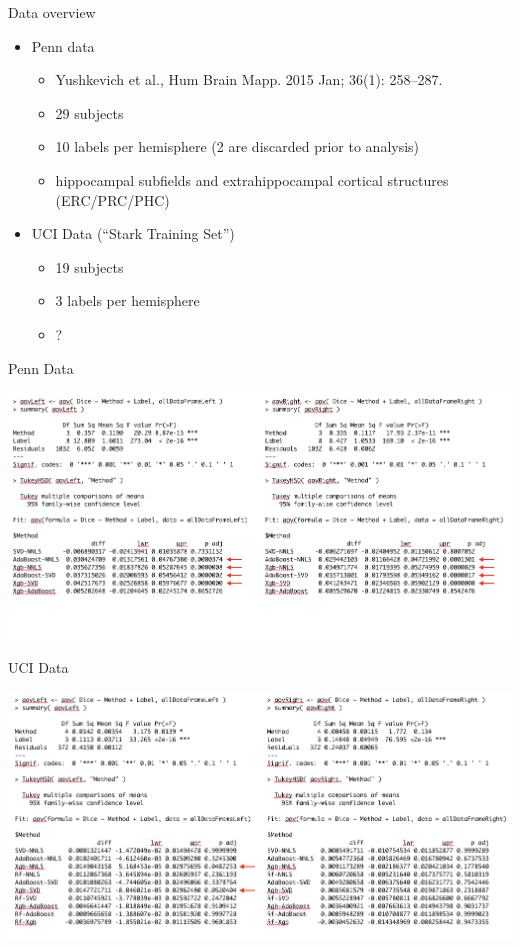 \documentclass[ignorenonframetext,]{beamer}
\providecommand{\tightlist}{%
  \setlength{\itemsep}{0pt}\setlength{\parskip}{0pt}}
\begin{document}
\begin{frame}{Data overview}

\begin{itemize}
\tightlist
\item
  Penn data

  \begin{itemize}
  \tightlist
  \item
    Yushkevich et al., Hum Brain Mapp. 2015 Jan; 36(1): 258--287.
  \item
    29 subjects
  \item
    10 labels per hemisphere (2 are discarded prior to analysis)
  \item
    hippocampal subfields and extrahippocampal cortical structures
    (ERC/PRC/PHC)
  \end{itemize}
\item
  UCI Data (``Stark Training Set'')

  \begin{itemize}
  \tightlist
  \item
    19 subjects
  \item
    3 labels per hemisphere
  \item
    ?
  \end{itemize}
\end{itemize}

\end{frame}

\begin{frame}{Penn Data}

\centering
\includegraphics[width=1 \textwidth]{../Figures/pennResults.png}

\end{frame}

\begin{frame}{UCI Data}

\centering
\includegraphics[width=1 \textwidth]{../Figures/uciResults.png}

\hypertarget{refs}{}

\end{frame}
\end{document}
